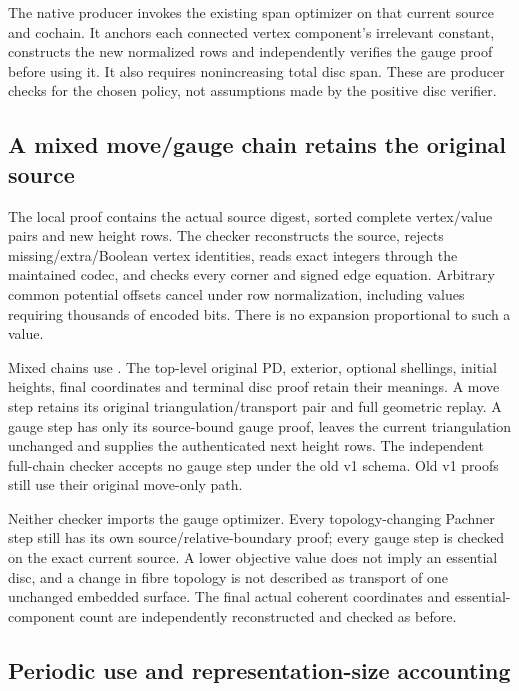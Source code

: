 The native producer invokes the existing span optimizer on that current
source and cochain. It anchors each connected vertex component's irrelevant
constant, constructs the new normalized rows and independently verifies the
gauge proof before using it. It also requires nonincreasing total disc span.
These are producer checks for the chosen policy, not assumptions made by the
positive disc verifier.

\subsection{A mixed move/gauge chain retains the original source}

The local  proof contains the actual source
digest, sorted complete vertex/value pairs and new height rows. The checker
reconstructs the source, rejects missing/extra/Boolean vertex identities,
reads exact integers through the maintained codec, and checks every corner
and signed edge equation. Arbitrary common potential offsets cancel under
row normalization, including values requiring thousands of encoded bits.
There is no expansion proportional to such a value.

Mixed chains use . The top-level original
PD, exterior, optional shellings, initial heights, final coordinates and
terminal disc proof retain their meanings. A move step retains its original
triangulation/transport pair and full geometric replay. A gauge step has
only its source-bound gauge proof, leaves the current triangulation unchanged
and supplies the authenticated next height rows. The independent full-chain
checker accepts no gauge step under the old v1 schema. Old v1 proofs still
use their original move-only path.

Neither checker imports the gauge optimizer. Every topology-changing
Pachner step still has its own source/relative-boundary proof; every gauge
step is checked on the exact current source. A lower objective value does
not imply an essential disc, and a change in fibre topology is not described
as transport of one unchanged embedded surface. The final actual coherent
coordinates and essential-component count are independently reconstructed
and checked as before.

\subsection{Periodic use and representation-size accounting}

